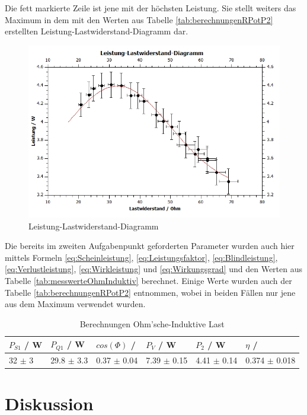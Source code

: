 \documentclass[12pt,a4paper,twoside]{article}
\begin{document}
\noindent
Die fett markierte Zeile ist jene mit der höchsten Leistung. Sie stellt weiters das Maximum in dem mit den Werten aus Tabelle \ref{tab:berechnungenRPotP2} erstellten Leistung-Lastwiderstand-Diagramm dar.

\begin{figure}[H]
    \centering
    \includegraphics[width=0.6\linewidth, angle=0]{nudes/Leistung-Lastwiderstand-Diagramm.jpg}
    \caption{Leistung-Lastwiderstand-Diagramm}
    \label{fig:LeistungLastwiderstandDiagramm}
\end{figure}

\noindent
Die bereits im zweiten Aufgabenpunkt geforderten Parameter wurden auch hier mittels Formeln \ref{eq:Scheinleistung}, \ref{eq:Leistungsfaktor}, \ref{eq:Blindleistung}, \ref{eq:Verlustleistung}, \ref{eq:Wirkleistung} und \ref{eq:Wirkungsgrad} und den Werten aus Tabelle \ref{tab:messwerteOhmInduktiv} berechnet. Einige Werte wurden auch der Tabelle \ref{tab:berechnungenRPotP2} entnommen, wobei in beiden Fällen nur jene aus dem Maximum verwendet wurden.

\begin{table}[H]
    \centering
    \caption{Berechnungen Ohm'sche-Induktive Last}
    \label{tab:BerechnungenOhmInd}
    \begin{tabular}{| l | l | l | l | l | l |}
        \hline
        $P_{S1}$ / W & $P_{Q1}$ / W & $cos(\Phi)$ / & $P_{V}$ / W & $P_{2}$ / W & $\eta$ / \\
        \hline
        32 $\pm$ 3 & 29.8 $\pm$ 3.3 & 0.37 $\pm$ 0.04 & 7.39 $\pm$ 0.15 & 4.41 $\pm$ 0.14 & 0.374 $\pm$ 0.018 \\
        \hline
    \end{tabular}
\end{table}


\section{Diskussion} %
\end{document}
